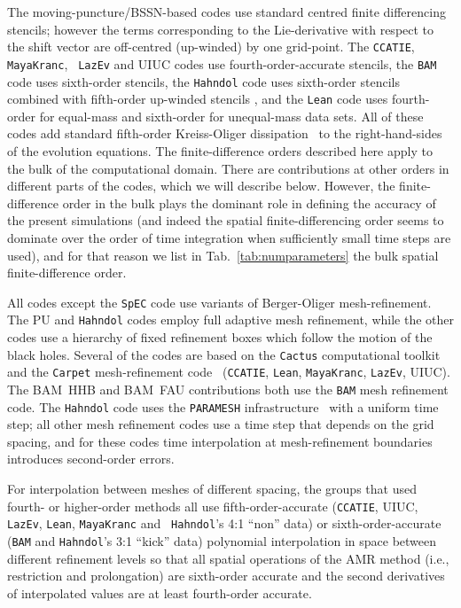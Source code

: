 The moving-puncture/BSSN-based codes use standard centred finite
differencing stencils; however the terms corresponding to the
Lie-derivative with respect to the shift vector are off-centred
(up-winded) by one grid-point. The {\tt CCATIE}, {\tt MayaKranc}, {\tt
LazEv} and UIUC codes use fourth-order-accurate stencils, the
\texttt{BAM} code uses sixth-order stencils, the {\tt Hahndol} code
uses sixth-order stencils combined with fifth-order up-winded stencils
\cite{Baker:2005xe}, and the \texttt{Lean} code uses fourth-order for
equal-mass and sixth-order for unequal-mass data sets. All of these
codes add standard fifth-order Kreiss-Oliger
dissipation~\cite{Kreiss73,Gustafsson95} to the right-hand-sides of
the evolution equations. The finite-difference orders described here
apply to the bulk of the computational domain. There are contributions
at other orders in different parts of the codes, which we will
describe below. However, the finite-difference order in the bulk plays
the dominant role in defining the accuracy of the present simulations
(and indeed the spatial finite-differencing order seems to dominate
over the order of time integration when sufficiently small time steps
are used), and for that reason we list in Tab.~\ref{tab:numparameters}
the bulk spatial finite-difference order.

All codes except the {\tt SpEC} code use variants of Berger-Oliger
mesh-refinement.  The PU and {\tt Hahndol} codes employ full adaptive
mesh refinement, while the other codes use a hierarchy of fixed
refinement boxes which follow the motion of the black holes. Several
of the codes are based on the \texttt{Cactus} computational
toolkit~\cite{Goodale02a,cactus}  and the \texttt{Carpet}
mesh-refinement code~\cite{Schnetter:2003rb,carpet} ({\tt CCATIE},
{\tt Lean}, {\tt MayaKranc}, {\tt LazEv}, UIUC). The BAM~HHB and
BAM~FAU contributions both use the {\tt BAM} mesh refinement code. The
{\tt Hahndol} code  uses the \texttt{PARAMESH}
infrastructure~\cite{MacNeice00} with a uniform time step; all other
mesh refinement codes use a time step that depends on the grid
spacing, and for these codes time interpolation at mesh-refinement
boundaries introduces second-order errors. 

For interpolation between meshes of different spacing, the groups that
used fourth- or higher-order methods all use fifth-order-accurate
({\tt CCATIE}, UIUC, {\tt LazEv}, {\tt Lean}, {\tt MayaKranc} and {\tt
Hahndol}'s 4:1 ``non'' data) or sixth-order-accurate ({\tt BAM} and
{\tt Hahndol}'s 3:1 ``kick'' data) polynomial interpolation in space
between different refinement levels so that all spatial operations of
the AMR method (i.e., restriction and prolongation) are sixth-order
accurate and the second derivatives of interpolated values are at
least fourth-order accurate.

